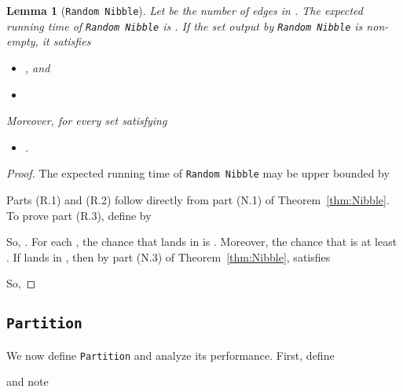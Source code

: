 \documentclass[11pt]{article}
\newtheorem{lemma}[theorem]{Lemma}
\begin{document}
\begin{lemma}[\texttt{Random Nibble}]\label{lem:randNibble}
Let  be the number of edges in .
The expected running time of \texttt{Random Nibble} is
  .
If the set  output by \texttt{Random Nibble} is non-empty, it satisfies
\begin{itemize}
\item [(R.1)] , and
\item [(R.2)] 
\end{itemize}
Moreover,
  for every set  satisfying

\begin{itemize}
\item [(R.3)] .
\end{itemize}
\end{lemma}

\begin{proof}
The expected running time of \texttt{Random Nibble}
  may be upper bounded by

Parts (R.1) and (R.2) follow directly from
  part (N.1) of Theorem~\ref{thm:Nibble}.
To prove part (R.3), define  by


So, .
For each , the chance that  lands in
   is .
Moreover, the chance that  is at least .
If  lands in , then by part (N.3) of
  Theorem~\ref{thm:Nibble},  satisfies

So,

\end{proof}


\subsection{\texttt{Partition}}

We now define \texttt{Partition} and analyze its performance.
First, define

and note



\vskip 0.2in
\noindent
{}
\vskip 0.2in
\end{document}
